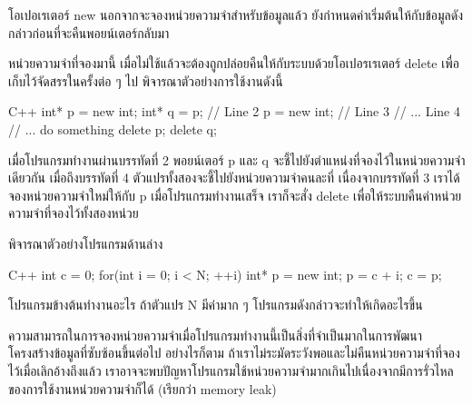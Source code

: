 โอเปอเรเตอร์ {\ct new} นอกจาก{\wbr}จะ{\wbr}จอง{\wbr}หน่วย{\wbr}ความ{\wbr}จำ{\wbr}สำหรับ{\wbr}ข้อมูล{\wbr}แล้ว{\wbr}
ยัง{\wbr}กำหนด{\wbr}ค่า{\wbr}เริ่มต้น{\wbr}ให้{\wbr}กับ{\wbr}ข้อมูล{\wbr}ดัง{\wbr}กล่าว{\wbr}ก่อน{\wbr}ที่{\wbr}จะ{\wbr}คืน{\wbr}พอยน์เตอร์{\wbr}กลับ{\wbr}มา{\wbr}

หน่วย{\wbr}ความ{\wbr}จำ{\wbr}ที่{\wbr}จอง{\wbr}มา{\wbr}นี้ เมื่อ{\wbr}ไม่{\wbr}ใช้{\wbr}แล้ว{\wbr}จะ{\wbr}ต้อง{\wbr}ถูก{\wbr}ปล่อย{\wbr}คืน{\wbr}ให้{\wbr}กับ{\wbr}ระบบ{\wbr}ด้วย{\wbr}โอ{\wbr}เป{\wbr}อร{\wbr}เรเตอร์ {\ct
  delete} เพื่อ{\wbr}เก็บ{\wbr}ไว้{\wbr}จัดสรร{\wbr}ใน{\wbr}ครั้ง{\wbr}ต่อ ๆ ไป  พิจารณา{\wbr}ตัวอย่าง{\wbr}การ{\wbr}ใช้งาน{\wbr}ดังนี้{\wbr}

\latintext
\begin{codelist}{C++}{}
int* p = new int;
int* q = p;           // Line 2
p = new int;          // Line 3
// ...                   Line 4
// ... do something
delete p;
delete q;
\end{codelist}
\thaitext

เมื่อ{\wbr}โปรแกรม{\wbr}ทำงาน{\wbr}ผ่าน{\wbr}บรรทัด{\wbr}ที่ 2 พอยน์เตอร์ {\ct p} และ {\ct q}
จะ{\wbr}ชี้{\wbr}ไป{\wbr}ยัง{\wbr}ตำแหน่ง{\wbr}ที่{\wbr}จอง{\wbr}ไว้{\wbr}ใน{\wbr}หน่วย{\wbr}ความ{\wbr}จำ{\wbr}เดียวกัน เมื่อ{\wbr}ถึง{\wbr}บรรทัด{\wbr}ที่ 4
ตัวแปร{\wbr}ทั้ง{\wbr}สอง{\wbr}จะ{\wbr}ชี้{\wbr}ไป{\wbr}ยัง{\wbr}หน่วย{\wbr}ความ{\wbr}จำ{\wbr}คน{\wbr}ละ{\wbr}ที่ เนื่อง{\wbr}จาก{\wbr}บรรทัด{\wbr}ที่ 3
เรา{\wbr}ได้{\wbr}จอง{\wbr}หน่วย{\wbr}ความ{\wbr}จำ{\wbr}ใหม่{\wbr}ให้{\wbr}กับ {\ct p} เมื่อ{\wbr}โปรแกรม{\wbr}ทำงาน{\wbr}เสร็จ เรา{\wbr}ก็{\wbr}จะ{\wbr}สั่ง {\ct
  delete} เพื่อ{\wbr}ให้{\wbr}ระบบ{\wbr}คืน{\wbr}ค่า{\wbr}หน่วย{\wbr}ความ{\wbr}จำ{\wbr}ที่{\wbr}จอง{\wbr}ไว้{\wbr}ทั้ง{\wbr}สอง{\wbr}หน่วย{\wbr}

พิจารณา{\wbr}ตัวอย่าง{\wbr}โปรแกรม{\wbr}ด้าน{\wbr}ล่าง{\wbr}

\latintext
\begin{codelist}{C++}{}
int c = 0;
for(int i = 0; i < N; ++i) {
  int* p = new int;
  p = c + i;
  c = p;
}
\end{codelist}
\thaitext

\begin{quiz}{}
โปรแกรม{\wbr}ข้าง{\wbr}ต้น{\wbr}ทำงาน{\wbr}อะไร  ถ้า{\wbr}ตัวแปร {\ct N} มี{\wbr}ค่า{\wbr}มาก ๆ โปรแกรม{\wbr}ดัง{\wbr}กล่าว{\wbr}จะ{\wbr}ทำให้{\wbr}เกิด{\wbr}อะไร{\wbr}ขึ้น{\wbr}
\end{quiz}

ความ{\wbr}สามารถ{\wbr}ใน{\wbr}การ{\wbr}จอง{\wbr}หน่วย{\wbr}ความ{\wbr}จำ{\wbr}เมื่อ{\wbr}โปรแกรม{\wbr}ทำงาน{\wbr}นี้{\wbr}เป็น{\wbr}สิ่ง{\wbr}ที่{\wbr}จำเป็น{\wbr}มาก{\wbr}ใน{\wbr}การ{\wbr}พัฒนา{\wbr}โครงสร้าง{\wbr}ข้อมูล{\wbr}ที่{\wbr}ซับซ้อน{\wbr}ขึ้น{\wbr}ต่อ{\wbr}ไป{\wbr}
อย่างไร{\wbr}ก็{\wbr}ตาม ถ้า{\wbr}เรา{\wbr}ไม่{\wbr}ระมัดระวัง{\wbr}พอ{\wbr}และ{\wbr}ไม่{\wbr}คืน{\wbr}หน่วย{\wbr}ความ{\wbr}จำ{\wbr}ที่{\wbr}จอง{\wbr}ไว้{\wbr}เมื่อ{\wbr}เลิก{\wbr}อ้าง{\wbr}ถึง{\wbr}แล้ว{\wbr}
เรา{\wbr}อาจ{\wbr}จะ{\wbr}พบ{\wbr}ปัญหา{\wbr}โปรแกรม{\wbr}ใช้{\wbr}หน่วย{\wbr}ความ{\wbr}จำ{\wbr}มาก{\wbr}เกิน{\wbr}ไป{\wbr}เนื่อง{\wbr}จาก{\wbr}มี{\wbr}การ{\wbr}รั่วไหล{\wbr}ของ{\wbr}การ{\wbr}ใช้งาน{\wbr}หน่วย{\wbr}ความ{\wbr}จำ{\wbr}ก็{\wbr}ได้{\wbr}
(เรียก{\wbr}ว่า memory leak)

